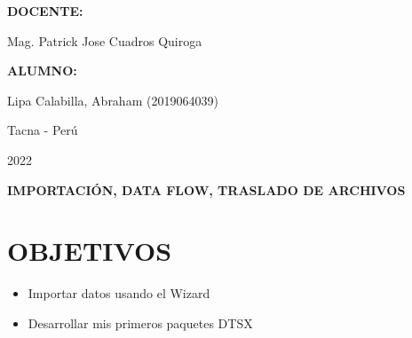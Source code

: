 \documentclass[12pt,letterpaper]{article}
\begin{document}
\begin{titlepage}
\begin{center}
\begin{large}
        \end{large}
        \vspace*{0.2in}
        \begin{Large}
            \textbf{DOCENTE:} \\
        \end{Large}
        \vspace*{0.1in}
        \begin{large}
            Mag. Patrick Jose Cuadros Quiroga\\
        \end{large}
        \vspace*{0.3in}
        \begin{large}
            \textbf{ALUMNO:} \\
            \begin{flushleft}
                Lipa Calabilla, Abraham  		\hfill	(2019064039) \\
            \end{flushleft}
        \end{large}
        \vspace*{1.3in}
        \begin{large}
            Tacna - Perú\\
        \end{large}
        \vspace*{0.1in}
        \begin{large}
            2022\\
        \end{large}
    \end{center}
\end{titlepage}

\newpage
\tableofcontents
\justify
\newpage
\begin{LARGE}
    \begin{center}
        \textbf{IMPORTACIÓN, DATA FLOW, TRASLADO DE ARCHIVOS} \\
    \end{center}
\end{LARGE}
\section{OBJETIVOS}
\begin{itemize}
    \item Importar datos usando el Wizard
    \item Desarrollar mis primeros paquetes DTSX
\end{itemize}
\end{document}

